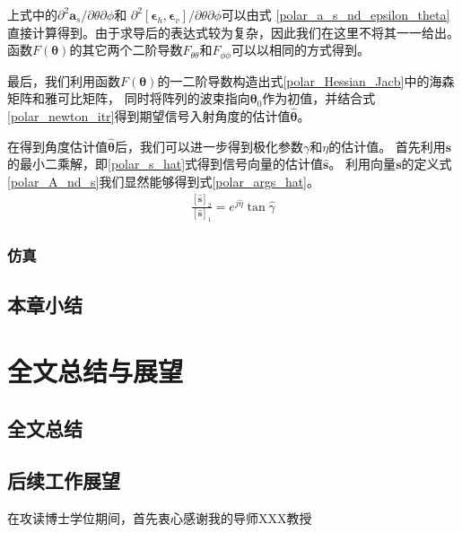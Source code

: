 \documentclass[master]{thesis-uestc}
\begin{document}
上式中的$\partial^2\bm{a}_s/\partial\theta\partial\phi$和
$\partial^2\left[\bm{\epsilon}_h,\bm{\epsilon}_v\right]/\partial\theta\partial\phi$可以由式
\eqref{polar_a_s_nd_epsilon_theta}直接计算得到。由于求导后的表达式较为复杂，因此我们在这里不将其一一给出。
函数$F(\bm{\theta})$的其它两个二阶导数$F_{\theta\theta}$和$F_{\phi\phi}$可以以相同的方式得到。

最后，我们利用函数$F(\bm{\theta})$的一二阶导数构造出式\eqref{polar_Hessian_Jacb}中的海森矩阵和雅可比矩阵，
同时将阵列的波束指向$\bm{\theta}_0$作为初值，并结合式\eqref{polar_newton_itr}得到期望信号入射角度的估计值$\hat{\bm{\theta}}$。

在得到角度估计值$\hat{\bm{\theta}}$后，我们可以进一步得到极化参数$\gamma$和$\eta$的估计值。
首先利用$\bm{s}$的最小二乘解，即\eqref{polar_s_hat}式得到信号向量的估计值$\hat{\bm{s}}$。
利用向量$\bm{s}$的定义式\eqref{polar_A_nd_s}我们显然能够得到式\eqref{polar_args_hat}。
\begin{equation}\label{polar_args_hat}
    \begin{aligned}
        \frac{\left[\hat{\bm{s}}\right]_2}{\left[\hat{\bm{s}}\right]_1} = 
        e^{j\hat{\eta}}\tan\hat{\gamma}
    \end{aligned}
\end{equation}

\subsection{仿真}

\section{本章小结}

\chapter{全文总结与展望}

\section{全文总结}

\section{后续工作展望}

\thesisacknowledgement
在攻读博士学位期间，首先衷心感谢我的导师XXX教授

\thesisappendix
\end{document}
